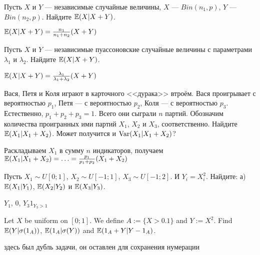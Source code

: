 \begin{problem}
 Пусть $X$ и $Y$ --- независимые случайные величины, $X$ --- $Bin(n_{1},p)$, $Y$ --- $Bin(n_{2},p)$. Найдите $\mathbb{E}(X|X+Y)$.
\end{problem} 
\begin{solution} 
$\mathbb{E}(X|X+Y)=\frac{n_{1}}{n_{1}+n_{2}}(X+Y)$
\end{solution}

\begin{problem}
 Пусть $X$ и $Y$ --- независимые пуассоновские случайные величины с параметрами $\lambda_{1}$ и $\lambda_{2}$. Найдите $\mathbb{E}(X|X+Y)$.
\end{problem} 
\begin{solution} 
$\mathbb{E}(X|X+Y)=\frac{\lambda_{1}}{\lambda_{1}+\lambda_{2}}(X+Y)$
\end{solution}

\begin{problem}
Вася, Петя и Коля играют в карточного <<дурака>> втроём. Вася проигрывает с вероятностью $p_1$, Петя --- с вероятностью $p_2$, Коля --- с вероятностью $p_3$. Естественно, $p_1+p_2+p_3=1$. Всего они сыграли $n$ партий. Обозначим количества проигранных ими партий $X_1$, $X_2$ и $X_3$, соответственно. Найдите $\mathbb{E}(X_1|X_1+X_2)$. Может получится и $\operatorname{Var}(X_1|X_1+X_2)$?
\end{problem} 
\begin{solution} 
Раскладываем $X_1$ в сумму $n$ индикаторов, получаем $\mathbb{E}(X_1|X_1+X_2)=\ldots=\frac{p_1}{p_1+p_2}(X_1+X_2)$
\end{solution}

\begin{problem}
Пусть $X_{1}\sim U[0;1]$, $X_{2}\sim U[-1;1]$, $X_{3}\sim U[-1;2]$. И $Y_{i}=X_{i}^{2}$. Найдите: а) $ \mathbb{E}(X_{1}|Y_{1}) $, $ \mathbb{E}(X_{2}|Y_{2}) $ и $ \mathbb{E}(X_{3}|Y_{3}) $.
\end{problem} 
\begin{solution} 
 $Y_{1}$, $0$, $Y_{3}1_{Y_{3}>1}$ 
\end{solution}

\begin{problem}
Let $ X $ be uniform on $[0;1]$. We define $ A:=\{X>0.1\} $ and $ Y:=X^{2} $. Find $ \mathbb{E}(Y|\sigma(1_{A})) $, $\mathbb{E}(1_{A}|\sigma(Y))$ and $\mathbb{E}(1_{A}+Y|Y-1_{A})$.
\end{problem} 
\begin{solution} 

\end{solution}

\begin{problem}
здесь был дубль задачи, он оставлен для сохранения нумерации
\end{problem} 
\begin{solution} 

\end{solution}

